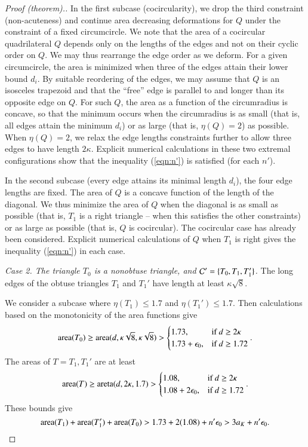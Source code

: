 \begin{proof}[Proof (theorem).]
In the first subcase (cocircularity), we drop the third constraint
(non-acuteness) and continue area decreasing deformations for $Q$
under the constraint of a fixed circumcircle.  We note that the area of
a cocircular quadrilateral $Q$ depends only on the lengths of the
edges and not on their cyclic order on $Q$.  We may thus rearrange the
edge order as we deform.  For a given circumcircle, the area is
minimized when three of the edges attain their lower bound $d_i$.  By
suitable reordering of the edges, we may assume that $Q$ is an
isosceles trapezoid and that the ``free'' edge is parallel to and
longer than its opposite edge on $Q$.  For such $Q$, the area as a
function of the circumradius is concave, so that the minimum occurs
when the circumradius is as small (that is, all edges attain the
minimum $d_i$) or as large (that is, $\eta(Q)=2$) as possible.
When $\eta(Q)=2$, we relax the edge lengths constraints further
to allow three edges to have length $2\kappa$.
Explicit numerical calculations in these two extremal configurations
show that the inequality (\ref{eqn:n'}) is satisfied (for each $n'$).

In the second subcase (every edge attains its minimal length $d_i$), the
four edge lengths are fixed.  The area of $Q$ is a concave function of
the length of the diagonal.  We thus minimize the area of $Q$ when the
diagonal is as small as possible (that is, $T_1$ is a right triangle
-- when this satisfies the other constraints) or as large as possible
(that is, $Q$ is cocircular).  The cocircular case has already been
considered.  Explicit numerical calculations of $Q$ when $T_1$ is
right gives the inequality (\ref{eqn:n'}) in each case.




{\it Case 2. The triangle $T_0$ is a nonobtuse triangle, and $\mathcal C'=\{T_0,T_1,T_1'\}$.}
The long edges of the obtuse triangles $T_1$ and $T_1'$ have length at least
$\kappa\sqrt{8}$.

We consider a subcase where $\eta(T_1)\le 1.7$ and $\eta(T_1') \le
1.7$.  Then calculations based on the monotonicity of the area
functions give
\[
{\operatorname{area}}(T_0) \ge {\operatorname{area}}(d,\kappa\sqrt{8},\kappa\sqrt{8}) > 
   \begin{cases}1.73,&\text{if } d \ge 2\kappa\\ 
     1.73+\epsilon_0, & \text{if } d \ge 1.72 \end{cases}.
\]
The areas of $T=T_1,T_1'$ are at least
\begin{equation}\label{eqn:173}
{\operatorname{area}}(T) \ge {\operatorname{areta}}(d,2\kappa,1.7) >
   \begin{cases}1.08,&\text{if } d \ge 2\kappa\\
     1.08+2\epsilon_0, & \text{if } d \ge 1.72 \end{cases}.
\end{equation}
These bounds give
\[
{\operatorname{area}}(T_1) + {\operatorname{area}}(T_1') + {\operatorname{area}}(T_0) > 1.73 + 2(1.08) + n'\epsilon_0 > 
3 a_K + n' \epsilon_0.
\]


\end{proof}
